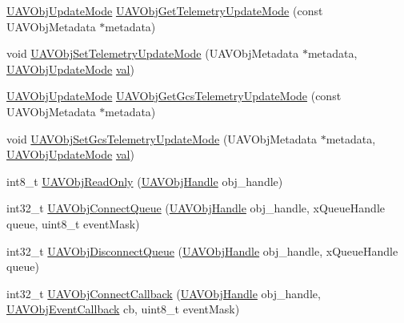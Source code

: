 \begin{DoxyCompactItemize}
\item 
\hyperlink{targets_2_u_a_v_objects_2inc_2uavobjectmanager_8h_afd571f69747daf7681eb869270e27208}{\-U\-A\-V\-Obj\-Update\-Mode} \hyperlink{group___u_a_v_object_handling_gaf40b4374b42f418959ac186ae2e2ec40}{\-U\-A\-V\-Obj\-Get\-Telemetry\-Update\-Mode} (const \-U\-A\-V\-Obj\-Metadata $\ast$metadata)
\item 
void \hyperlink{group___u_a_v_object_handling_ga383e4286d101cd29646b5e4b0e4b6199}{\-U\-A\-V\-Obj\-Set\-Telemetry\-Update\-Mode} (\-U\-A\-V\-Obj\-Metadata $\ast$metadata, \hyperlink{targets_2_u_a_v_objects_2inc_2uavobjectmanager_8h_afd571f69747daf7681eb869270e27208}{\-U\-A\-V\-Obj\-Update\-Mode} \hyperlink{group___p_i_o_s___t_i_m_ga757344f09097232d715d55cbf9d61a43}{val})
\item 
\hyperlink{targets_2_u_a_v_objects_2inc_2uavobjectmanager_8h_afd571f69747daf7681eb869270e27208}{\-U\-A\-V\-Obj\-Update\-Mode} \hyperlink{group___u_a_v_object_handling_gad0cb8d70597ac74cdbe8923c66f1c5f1}{\-U\-A\-V\-Obj\-Get\-Gcs\-Telemetry\-Update\-Mode} (const \-U\-A\-V\-Obj\-Metadata $\ast$metadata)
\item 
void \hyperlink{group___u_a_v_object_handling_gaf23cc9b03d0eaa4dbf1aec969180f712}{\-U\-A\-V\-Obj\-Set\-Gcs\-Telemetry\-Update\-Mode} (\-U\-A\-V\-Obj\-Metadata $\ast$metadata, \hyperlink{targets_2_u_a_v_objects_2inc_2uavobjectmanager_8h_afd571f69747daf7681eb869270e27208}{\-U\-A\-V\-Obj\-Update\-Mode} \hyperlink{group___p_i_o_s___t_i_m_ga757344f09097232d715d55cbf9d61a43}{val})
\item 
int8\-\_\-t \hyperlink{group___u_a_v_object_handling_gac4c6b71eb37b913f642f528ce4627996}{\-U\-A\-V\-Obj\-Read\-Only} (\hyperlink{targets_2_u_a_v_objects_2inc_2uavobjectmanager_8h_a279053e22be53ce9f895043aaeb91e3b}{\-U\-A\-V\-Obj\-Handle} obj\-\_\-handle)
\item 
int32\-\_\-t \hyperlink{group___u_a_v_object_handling_ga0ee2030a00c48317b268e82dac8be146}{\-U\-A\-V\-Obj\-Connect\-Queue} (\hyperlink{targets_2_u_a_v_objects_2inc_2uavobjectmanager_8h_a279053e22be53ce9f895043aaeb91e3b}{\-U\-A\-V\-Obj\-Handle} obj\-\_\-handle, x\-Queue\-Handle queue, uint8\-\_\-t event\-Mask)
\item 
int32\-\_\-t \hyperlink{group___u_a_v_object_handling_ga42fd51da437a13e22879d922fd771070}{\-U\-A\-V\-Obj\-Disconnect\-Queue} (\hyperlink{targets_2_u_a_v_objects_2inc_2uavobjectmanager_8h_a279053e22be53ce9f895043aaeb91e3b}{\-U\-A\-V\-Obj\-Handle} obj\-\_\-handle, x\-Queue\-Handle queue)
\item 
int32\-\_\-t \hyperlink{group___u_a_v_object_handling_gaf37f8752f1cde59a9b77d9ed7709c365}{\-U\-A\-V\-Obj\-Connect\-Callback} (\hyperlink{targets_2_u_a_v_objects_2inc_2uavobjectmanager_8h_a279053e22be53ce9f895043aaeb91e3b}{\-U\-A\-V\-Obj\-Handle} obj\-\_\-handle, \hyperlink{targets_2_u_a_v_objects_2inc_2uavobjectmanager_8h_a33d11560e38b56dc904220fb0f785c28}{\-U\-A\-V\-Obj\-Event\-Callback} cb, uint8\-\_\-t event\-Mask)

\end{DoxyCompactItemize}
